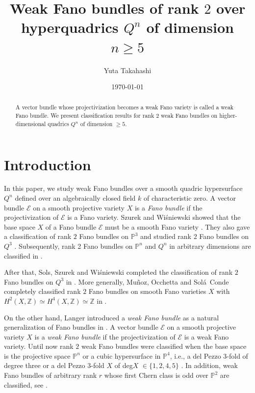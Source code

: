 \documentclass{amsproc}
\theoremstyle{definition}
\def\P{{\mathbb P}}
\def\Z{{\mathbb Z}}
\def\cE{{\mathcal E}}
\begin{document}
\title{Weak Fano bundles of rank $2$ over hyperquadrics $Q^n$ of dimension $n \ge 5$}

\author{Yuta Takahashi}
\date{\today}
\address{Department of Mathematics, Faculty of Science and Engineering, Chuo University.
1-13-27 Kasuga, Bunkyo-ku, Tokyo 112-8551, Japan}
\maketitle
\begin{abstract} 
A vector bundle whose projectivization becomes a weak Fano variety is called a weak Fano bundle. We present classification results for rank 2 weak Fano bundles on higher-dimensional quadrics $Q^n$ of dimension $\ge 5$. 
\end{abstract}
\tableofcontents
\section{Introduction}In this paper, we study weak Fano bundles over a smooth quadric hypersurface $Q^n$ defined over an algebraically closed field $k$ of characteristic zero. 
A vector bundle $\cE$ on a smooth projective variety $X$ is a {\it Fano bundle} if the projectivization of $\cE$ is a Fano variety. Szurek and Wi{\'s}niewski showed that the base space $X$ of a Fano bundle $\cE$ must be a smooth Fano variety \cite[Theorem~1.6]{SW90}. They also gave a classification of rank $2$ Fano bundles on $\P^3$ and studied  rank $2$ Fano bundles on $Q^3$ \cite[Theorem~2.1 and Section~3]{SW90}. Subsequently, rank 2 Fano bundles on $\P^n$ and $Q^n$ in arbitrary dimensions are classified in \cite[Main Theorem]{APW94}. 

After that, Sols, Szurek and Wi{\'s}niewski completed the classification of rank $2$ Fano bundles on $Q^3$ in \cite{SSW91}. More generally, Mu{\~n}oz, Occhetta and Sol{\'a}~Conde completely classified rank $2$ Fano bundles on smooth Fano varieties $X$ with $H^2(X,\Z)\simeq H^4(X,\Z)\simeq \Z$ in \cite{MOS12, MOS14, MOS142}.  

On the other hand, Langer introduced a {\it weak Fano bundle} as a natural generalization of Fano bundles in \cite{L98}. A vector bundle $\cE$ on a smooth projective variety $X$ is a {\it weak Fano bundle} if the projectivization of $\cE$ is a weak Fano variety.  Until now rank $2$ weak Fano bundles were classified when the base space is the projective space $\P^n$ \cite{Y12} or a cubic hypersurface in $\P^4$, i.e., a del Pezzo 3-fold of degree three \cite{I16} or a del Pezzo 3-fold $X$ of deg$X$ $\in \{1,2,4,5\}$ \cite{FHI22, FHI23}. In addition, weak Fano bundles of arbitrary rank $r$ whose first Chern class is odd over $\P^2$ are classified, see \cite{L98, O20}. 
\end{document}
